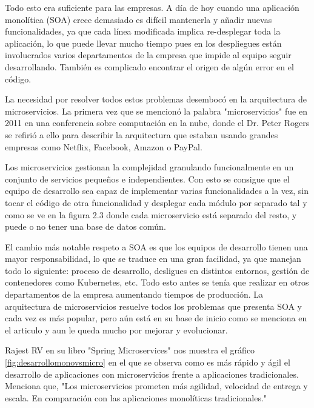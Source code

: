 \documentclass[12pt]{report} %
\begin{document}
Todo esto era suficiente para las empresas. A día de hoy cuando una aplicación monolítica (SOA) crece demasiado es difícil mantenerla y añadir nuevas funcionalidades, ya que cada línea modificada implica re-desplegar toda la aplicación, lo que puede llevar mucho tiempo pues en los despliegues están involucrados varios departamentos de la empresa que impide al equipo seguir desarrollando. También es complicado encontrar el origen de algún error en el código.

La necesidad por resolver todos estos problemas desembocó en la arquitectura de microservicios. La primera vez que se mencionó la palabra "microservicios" fue en 2011 en una conferencia sobre computación en la nube, donde el Dr. Peter Rogers\cite{breveHistoria} se refirió a ello para describir la arquitectura que estaban usando grandes empresas como Netflix, Facebook, Amazon o PayPal. 

Los microservicios gestionan la complejidad granulando funcionalmente en un conjunto de servicios pequeños e independientes. Con esto se consigue que el equipo de desarrollo sea capaz de implementar varias funcionalidades a la vez, sin tocar el código de otra  funcionalidad y desplegar cada módulo por separado tal y como se ve en la figura 2.3 donde cada microservicio está separado del resto, y puede o no tener una base de datos común.

El cambio más notable respeto a SOA es que los equipos de desarrollo tienen una mayor responsabilidad, lo que se traduce en una gran facilidad, ya que manejan todo lo siguiente:  proceso de desarrollo, desligues en distintos entornos, gestión de contenedores como Kubernetes, etc. Todo esto antes se tenía que realizar en otros departamentos de la empresa aumentando tiempos de producción. La arquitectura de microservicios resuelve todos los problemas que presenta SOA y cada vez es más popular, pero aún está en su base de inicio como se menciona en el articulo\cite{Dragoni2017} y aun le queda mucho por mejorar y evolucionar.
 
 
 
Rajest RV en su libro "Spring Microservices"\cite{rv2016spring} nos muestra el gráfico \ref{fig:desarrollomonovsmicro} en el que se observa como es más rápido y ágil el desarrollo de aplicaciones con microservicios frente a aplicaciones tradicionales. Menciona que, "Los microservicios prometen más agilidad, velocidad de entrega y escala. En comparación con las aplicaciones monolíticas tradicionales." 
\end{document}
